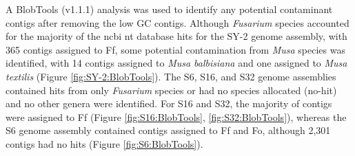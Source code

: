 A BlobTools (v1.1.1) analysis was used to identify any potential contaminant contigs after removing the low GC contigs. Although \textit{Fusarium} species accounted for the majority of the \ac{ncbi} nt database hits for the SY-2 genome assembly, with 365 contigs assigned to \ac{Ff}, some potential contamination from \textit{Musa} species was identified, with 14 contigs assigned to \textit{Musa balbisiana} and one assigned to \textit{Musa textilis} (Figure \ref{fig:SY-2:BlobTools}). The S6, S16, and S32 genome assemblies contained hits from only \textit{Fusarium} species or had no species allocated (no-hit) and no other genera were identified. For S16 and S32, the majority of contigs were assigned to \acf{Ff} (Figure \ref{fig:S16:BlobTools}, \ref{fig:S32:BlobTools}), whereas the  S6 genome assembly contained contigs assigned to \ac{Ff} and \ac{Fo}, although 2,301 contigs had no hits (Figure \ref{fig:S6:BlobTools}).  

